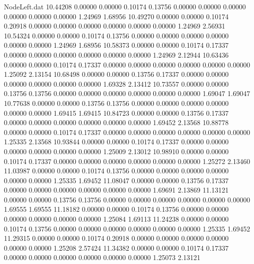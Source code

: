 \begin{filecontents}{NodeLeft.dat}
  10.44208    0.00000    0.00000     0.10174    0.13756    0.00000    0.00000    0.00000    0.00000    0.00000    0.00000    1.24969    1.68956
  10.49270    0.00000    0.00000     0.10174    0.20918    0.00000    0.00000    0.00000    0.00000    0.00000    0.00000    1.24969    2.56931
  10.54324    0.00000    0.00000     0.10174    0.13756    0.00000    0.00000    0.00000    0.00000    0.00000    0.00000    1.24969    1.68956
  10.58373    0.00000    0.00000     0.10174    0.17337    0.00000    0.00000    0.00000    0.00000    0.00000    0.00000    1.24969    2.12944
  10.63436    0.00000    0.00000     0.10174    0.17337    0.00000    0.00000    0.00000    0.00000    0.00000    0.00000    1.25092    2.13154
  10.68498    0.00000    0.00000     0.13756    0.17337    0.00000    0.00000    0.00000    0.00000    0.00000    0.00000    1.69328    2.13412
  10.73557    0.00000    0.00000     0.13756    0.13756    0.00000    0.00000    0.00000    0.00000    0.00000    0.00000    1.69047    1.69047
  10.77638    0.00000    0.00000     0.13756    0.13756    0.00000    0.00000    0.00000    0.00000    0.00000    0.00000    1.69415    1.69415
  10.84723    0.00000    0.00000     0.13756    0.17337    0.00000    0.00000    0.00000    0.00000    0.00000    0.00000    1.69452    2.13568
  10.88778    0.00000    0.00000     0.10174    0.17337    0.00000    0.00000    0.00000    0.00000    0.00000    0.00000    1.25335    2.13568
  10.93844    0.00000    0.00000     0.10174    0.17337    0.00000    0.00000    0.00000    0.00000    0.00000    0.00000    1.25009    2.13012
  10.98910    0.00000    0.00000     0.10174    0.17337    0.00000    0.00000    0.00000    0.00000    0.00000    0.00000    1.25272    2.13460
  11.03987    0.00000    0.00000     0.10174    0.13756    0.00000    0.00000    0.00000    0.00000    0.00000    0.00000    1.25335    1.69452
  11.08047    0.00000    0.00000     0.13756    0.17337    0.00000    0.00000    0.00000    0.00000    0.00000    0.00000    1.69691    2.13869
  11.13121    0.00000    0.00000     0.13756    0.13756    0.00000    0.00000    0.00000    0.00000    0.00000    0.00000    1.69555    1.69555
  11.18182    0.00000    0.00000     0.10174    0.13756    0.00000    0.00000    0.00000    0.00000    0.00000    0.00000    1.25084    1.69113
  11.24238    0.00000    0.00000     0.10174    0.13756    0.00000    0.00000    0.00000    0.00000    0.00000    0.00000    1.25335    1.69452
  11.29315    0.00000    0.00000     0.10174    0.20918    0.00000    0.00000    0.00000    0.00000    0.00000    0.00000    1.25208    2.57424
  11.34382    0.00000    0.00000     0.10174    0.17337    0.00000    0.00000    0.00000    0.00000    0.00000    0.00000    1.25073    2.13121

\end{filecontents}
